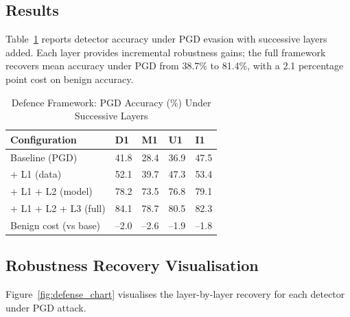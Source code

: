 \documentclass[sigconf,nonacm]{acmart}
\begin{document}
\subsection{Results}

Table~\ref{tab:defense_results} reports detector accuracy under PGD evasion
with successive layers added. Each layer provides incremental robustness
gains; the full framework recovers mean accuracy under PGD from 38.7\% to
81.4\%, with a 2.1 percentage point cost on benign accuracy.

\begin{table}[h]
\caption{Defence Framework: PGD Accuracy (\%) Under Successive Layers}
\label{tab:defense_results}
\small
\begin{tabularx}{\columnwidth}{@{}p{2.2cm}*{4}{X}@{}}
\toprule
\textbf{Configuration} & \textbf{D1} & \textbf{M1} & \textbf{U1} & \textbf{I1} \\
\midrule
Baseline (PGD)        & 41.8 & 28.4 & 36.9 & 47.5 \\
+ L1 (data)           & 52.1 & 39.7 & 47.3 & 53.4 \\
+ L1 + L2 (model)     & 78.2 & 73.5 & 76.8 & 79.1 \\
+ L1 + L2 + L3 (full) & 84.1 & 78.7 & 80.5 & 82.3 \\
\midrule
Benign cost (vs base) & --2.0 & --2.6 & --1.9 & --1.8 \\
\bottomrule
\end{tabularx}
\end{table}

\subsection{Robustness Recovery Visualisation}

Figure~\ref{fig:defense_chart} visualises the layer-by-layer recovery for
each detector under PGD attack.
\end{document}
